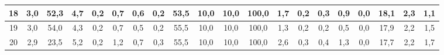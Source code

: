 \begin{sidewaystable}[]
\begin{tabular}{|c|c|c|c|c|c|c|c|c|c|c|c|c|c|c|c|c|c|c|c|}
    18 & 3,0                                              & 52,3                                             & 4,7                                              & 0,2                                              & 0,7                                              & 0,6                                              & 0,2                                              & 53,5                                            & 10,0                                            & 10,0                                            & 100,0                                           & 1,7                                             & 0,2                                             & 0,3                                             & 0,9                                             & 0,0                                             & 18,1                                             & 2,3                                              & 1,1                                              \\ \hline
    19 & 3,0                                              & 54,0                                             & 4,3                                              & 0,2                                              & 0,7                                              & 0,5                                              & 0,2                                              & 55,5                                            & 10,0                                            & 10,0                                            & 100,0                                           & 1,3                                             & 0,2                                             & 0,2                                             & 0,5                                             & 0,0                                             & 17,9                                             & 2,2                                              & 1,5                                              \\ \hline
    20 & 2,9                                              & 23,5                                             & 5,2                                              & 0,2                                              & 1,2                                              & 0,7                                              & 0,3                                              & 55,5                                            & 10,0                                            & 10,0                                            & 100,0                                           & 2,6                                             & 0,3                                             & 0,4                                             & 1,3                                             & 0,0                                             & 17,7                                             & 2,2                                              & 1,7                                              \\ \hline

\end{tabular}
\end{sidewaystable}
